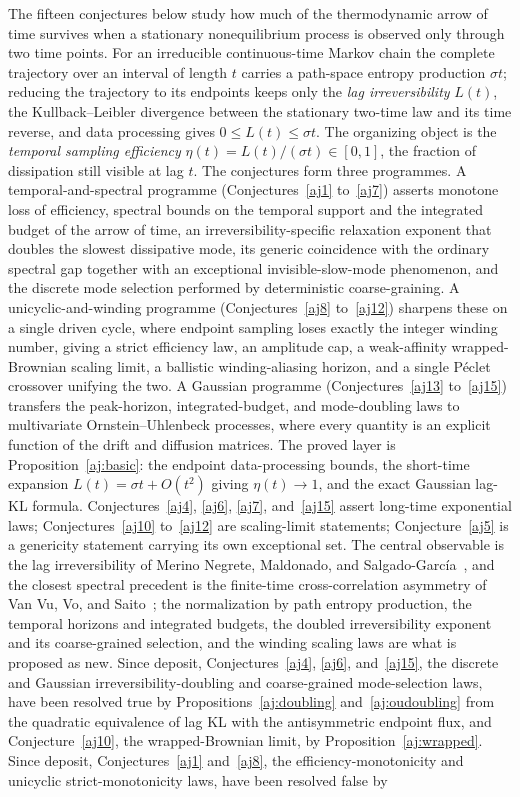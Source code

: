 \documentclass[11pt]{article}
\theoremstyle{definition}
\begin{document}
The fifteen conjectures below study how much of the thermodynamic arrow of time survives when a stationary nonequilibrium process is observed only through two time points.  For an irreducible continuous-time Markov chain the complete trajectory over an interval of length $t$ carries a path-space entropy production $\sigma t$; reducing the trajectory to its endpoints keeps only the \emph{lag irreversibility} $L(t)$, the Kullback--Leibler divergence between the stationary two-time law and its time reverse, and data processing gives $0\le L(t)\le\sigma t$.  The organizing object is the \emph{temporal sampling efficiency} $\eta(t)=L(t)/(\sigma t)\in[0,1]$, the fraction of dissipation still visible at lag $t$.  The conjectures form three programmes.  A temporal-and-spectral programme (Conjectures~\ref{aj1} to~\ref{aj7}) asserts monotone loss of efficiency, spectral bounds on the temporal support and the integrated budget of the arrow of time, an irreversibility-specific relaxation exponent that doubles the slowest dissipative mode, its generic coincidence with the ordinary spectral gap together with an exceptional invisible-slow-mode phenomenon, and the discrete mode selection performed by deterministic coarse-graining.  A unicyclic-and-winding programme (Conjectures~\ref{aj8} to~\ref{aj12}) sharpens these on a single driven cycle, where endpoint sampling loses exactly the integer winding number, giving a strict efficiency law, an amplitude cap, a weak-affinity wrapped-Brownian scaling limit, a ballistic winding-aliasing horizon, and a single P\'eclet crossover unifying the two.  A Gaussian programme (Conjectures~\ref{aj13} to~\ref{aj15}) transfers the peak-horizon, integrated-budget, and mode-doubling laws to multivariate Ornstein--Uhlenbeck processes, where every quantity is an explicit function of the drift and diffusion matrices.  The proved layer is Proposition~\ref{aj:basic}: the endpoint data-processing bounds, the short-time expansion $L(t)=\sigma t+O(t^2)$ giving $\eta(t)\to1$, and the exact Gaussian lag-KL formula.  Conjectures~\ref{aj4}, \ref{aj6}, \ref{aj7}, and~\ref{aj15} assert long-time exponential laws; Conjectures~\ref{aj10} to~\ref{aj12} are scaling-limit statements; Conjecture~\ref{aj5} is a genericity statement carrying its own exceptional set.  The central observable is the lag irreversibility of Merino Negrete, Maldonado, and Salgado-Garc\'ia~\cite{MMS23}, and the closest spectral precedent is the finite-time cross-correlation asymmetry of Van Vu, Vo, and Saito~\cite{VVS24}; the normalization by path entropy production, the temporal horizons and integrated budgets, the doubled irreversibility exponent and its coarse-grained selection, and the winding scaling laws are what is proposed as new.  Since deposit, Conjectures~\ref{aj4}, \ref{aj6}, and~\ref{aj15}, the discrete and Gaussian irreversibility-doubling and coarse-grained mode-selection laws, have been resolved true by Propositions~\ref{aj:doubling} and~\ref{aj:oudoubling} from the quadratic equivalence of lag KL with the antisymmetric endpoint flux, and Conjecture~\ref{aj10}, the wrapped-Brownian limit, by Proposition~\ref{aj:wrapped}.  Since deposit, Conjectures~\ref{aj1} and~\ref{aj8}, the efficiency-monotonicity and unicyclic strict-monotonicity laws, have been resolved false by 
\end{document}
